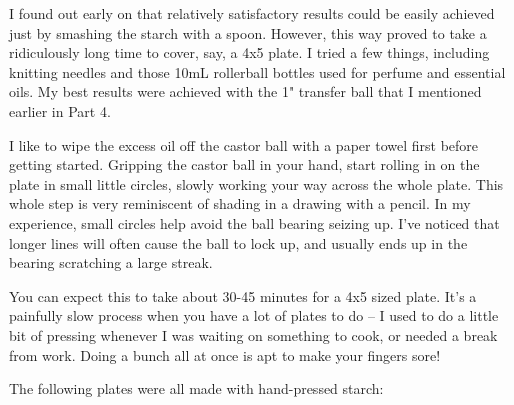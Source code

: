 \documentclass[11pt]{article}
\begin{document}
I found out early on that relatively satisfactory results could be easily achieved just by smashing the starch with a spoon. However, this way proved to take a ridiculously long time to cover, say, a 4x5 plate. I tried a few things, including knitting needles and those 10mL rollerball bottles used for perfume and essential oils. My best results were achieved with the 1" transfer ball that I mentioned earlier in Part 4.\newline

I like to wipe the excess oil off the castor ball with a paper towel first before getting started. Gripping the castor ball in your hand, start rolling in on the plate in small little circles, slowly working your way across the whole plate. This whole step is very reminiscent of shading in a drawing with a pencil. In my experience, small circles help avoid the ball bearing seizing up. I've noticed that longer lines will often cause the ball to lock up, and usually ends up in the bearing scratching a large streak.\newline

You can expect this to take about 30-45 minutes for a 4x5 sized plate. It's a painfully slow process when you have a lot of plates to do -- I used to do a little bit of pressing whenever I was waiting on something to cook, or needed a break from work. Doing a bunch all at once is apt to make your fingers sore!\newline


The following plates were all made with hand-pressed starch:
\end{document}
